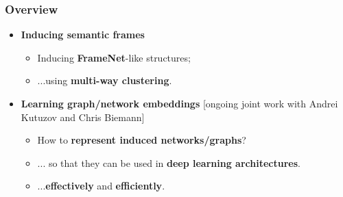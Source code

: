 \begin{frame}
  \frametitle{Overview}

  \begin{itemize}
  
  		
  		\pause 	
  		\vspace{10pt}
  
		\item \alert{\textbf{Inducing semantic frames}} \cite{ustalov2018unsupervised} 
		\begin{itemize}
			\item Inducing \textbf{FrameNet}-like structures;
			\item ...using \textbf{multi-way clustering}.
		\end{itemize}
		
		\pause 
		\vspace{10pt} 
		
		\item \alert{\textbf{Learning graph/network embeddings}} [ongoing joint work with Andrei Kutuzov and Chris Biemann]
		\begin{itemize}
		\item How to \textbf{represent induced networks/graphs}?
		\item ... so that they can be used in \textbf{deep learning architectures}.
		\item ...\textbf{effectively} and \textbf{efficiently}.
		\end{itemize}
		
		 
				
	
			
\end{itemize}
	
\end{frame}



